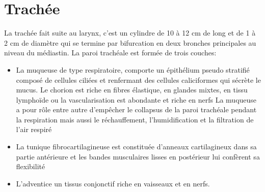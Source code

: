 
\chapter{Trachée} %


\label{ch:01-01} %



La trachée fait suite au larynx, c’est un cylindre de 10 à 12 cm de long et de 1 à 2 cm de diamètre qui se termine par bifurcation en deux bronches principales au niveau du médiastin. La paroi trachéale est formée de trois couches: 
\begin{itemize}
\item La muqueuse de type respiratoire, comporte un épithélium pseudo stratifié composé de cellules ciliées et renfermant des cellules caliciformes qui sécrète le mucus. Le chorion est riche en fibres élastique, en glandes mixtes, en tissu lymphoïde ou la vascularisation est abondante et riche en nerfs La muqueuse a pour rôle entre autre d’empêcher le collapsus de la paroi trachéale pendant la respiration mais aussi le réchauffement, l’humidification et la filtration de l’air respiré
\item La tunique fibrocartilagineuse est constituée d’anneaux cartilagineux dans sa partie antérieure et les bandes musculaires lisses en postérieur lui confèrent sa flexibilité
\item L’adventice un tissus conjonctif riche en vaisseaux et en nerfs.
\end{itemize}

